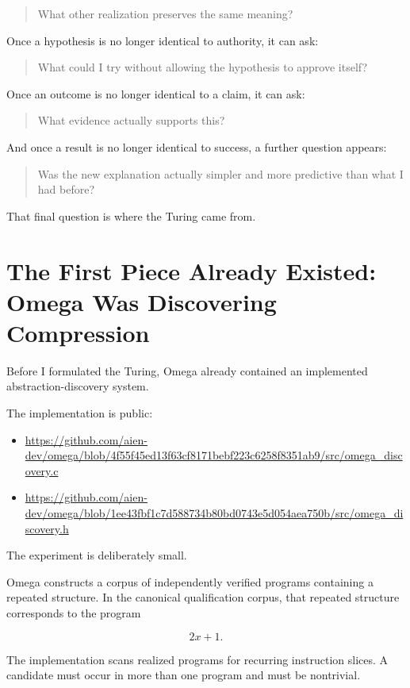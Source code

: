 \documentclass[11pt]{article}
\begin{document}
\begin{quote}
What other realization preserves the same meaning?
\end{quote}

Once a hypothesis is no longer identical to authority, it can ask:

\begin{quote}
What could I try without allowing the hypothesis to approve itself?
\end{quote}

Once an outcome is no longer identical to a claim, it can ask:

\begin{quote}
What evidence actually supports this?
\end{quote}

And once a result is no longer identical to success, a further question appears:

\begin{quote}
Was the new explanation actually simpler and more predictive than what I had before?
\end{quote}

That final question is where the Turing came from.

\section{The First Piece Already Existed: Omega Was Discovering Compression}

Before I formulated the Turing, Omega already contained an implemented abstraction-discovery system.

The implementation is public:

\begin{itemize}
    \item \url{https://github.com/aien-dev/omega/blob/4f55f45ed13f63cf8171bebf223c6258f8351ab9/src/omega_discovery.c}
    \item \url{https://github.com/aien-dev/omega/blob/1ee43fbf1c7d588734b80bd0743e5d054aea750b/src/omega_discovery.h}
\end{itemize}

The experiment is deliberately small.

Omega constructs a corpus of independently verified programs containing a repeated structure. In the canonical qualification corpus, that repeated structure corresponds to the program

\[
2x+1.
\]

The implementation scans realized programs for recurring instruction slices. A candidate must occur in more than one program and must be nontrivial.
\end{document}
